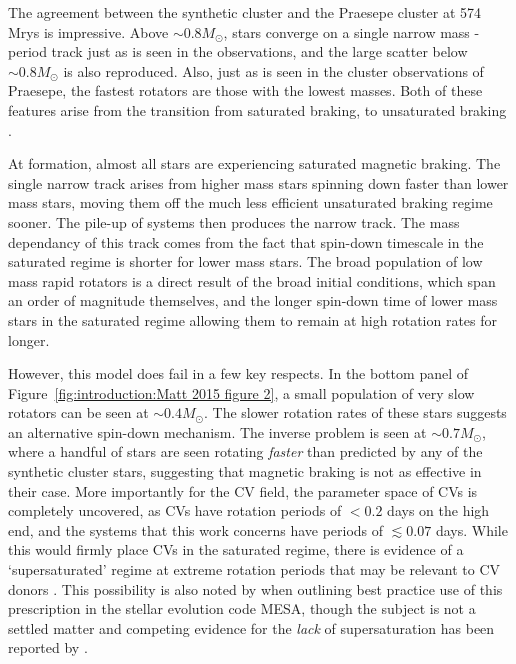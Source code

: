 The agreement between the synthetic cluster and the Praesepe cluster at 574 Mrys is impressive. Above $\sim 0.8 M_\odot$, stars converge on a single narrow mass - period track just as is seen in the observations, and the large scatter below $\sim 0.8 M_\odot$ is also reproduced. Also, just as is seen in the cluster observations of Praesepe, the fastest rotators are those with the lowest masses. Both of these features arise from the transition from saturated braking, to unsaturated braking \citep{matt2015}. 

At formation, almost all stars are experiencing saturated magnetic braking. The single narrow track arises from higher mass stars spinning down faster than lower mass stars, moving them off the much less efficient unsaturated braking regime sooner. The pile-up of systems then produces the narrow track. The mass dependancy of this track comes from the fact that spin-down timescale in the saturated regime is shorter for lower mass stars.
The broad population of low mass rapid rotators is a direct result of the broad initial conditions, which span an order of magnitude themselves, and the longer spin-down time of lower mass stars in the saturated regime allowing them to remain at high rotation rates for longer. 

However, this model does fail in a few key respects. In the bottom panel of Figure~\ref{fig:introduction:Matt 2015 figure 2}, a small population of very slow rotators can be seen at $\sim 0.4 M_\odot$. The slower rotation rates of these stars suggests an alternative spin-down mechanism. The inverse problem is seen at $\sim 0.7 M_\odot$, where a handful of stars are seen rotating {\it faster} than predicted by any of the synthetic cluster stars, suggesting that magnetic braking is not as effective in their case.
More importantly for the CV field, the parameter space of CVs is completely uncovered, as CVs have rotation periods of $< 0.2$ days on the high end, and the systems that this work concerns have periods of $\lesssim 0.07$ days. While this would firmly place CVs in the saturated regime, there is evidence of a `supersaturated' regime at extreme rotation periods that may be relevant to CV donors \citep{James2000, Wright2011, Argiroffi2016}. This possibility is also noted by \citet{Gossage2021} when outlining best practice use of this prescription in the stellar evolution code MESA, though the subject is not a settled matter and competing evidence for the {\it lack} of supersaturation has been reported by \citet{jeffries2011}.


